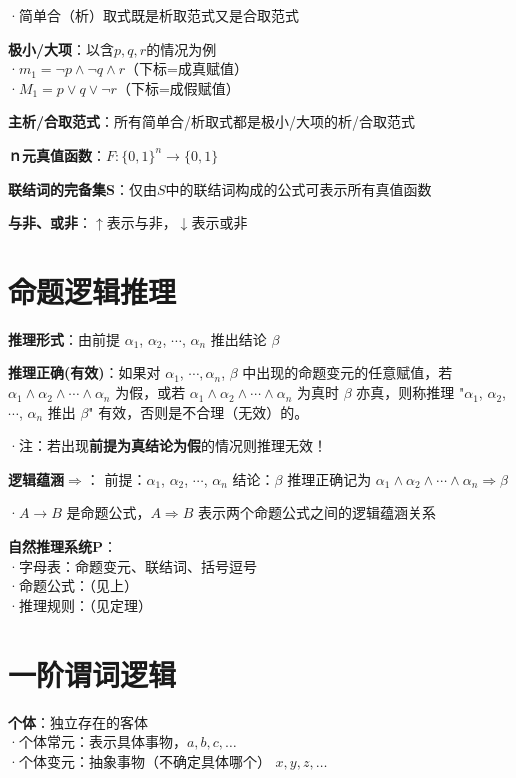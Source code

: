 ·简单合（析）取式既是析取范式又是合取范式

\textbf{极小/大项}：以含$p, q, r$的情况为例\\
·$m_1 = \lnot p \wedge \lnot q \wedge r$（下标=成真赋值）\\
·$M_1 = p \vee q \vee \lnot r$（下标=成假赋值）

\textbf{主析/合取范式}：所有简单合/析取式都是极小/大项的析/合取范式

\textbf{ｎ元真值函数}：$F:\{0,1\}^n \rightarrow \{0,1\}$

\textbf{联结词的完备集S}：仅由$S$中的联结词构成的公式可表示所有真值函数

\textbf{与非、或非}：$\uparrow$表示与非，$\downarrow$表示或非

\section*{命题逻辑推理}
	
\textbf{推理形式}：由前提 $\alpha_1$, $\alpha_2$, $\cdots$, $\alpha_n$ 推出结论 $\beta$

\textbf{推理正确(有效)}：如果对 $\alpha_1$, $\cdots, \alpha_n$, $\beta$ 中出现的命题变元的任意赋值，若 $\alpha_1 \land \alpha_2 \land \cdots \land \alpha_n$ 为假，或若 $\alpha_1 \land \alpha_2 \land \cdots \land \alpha_n$ 为真时 $\beta$ 亦真，则称推理 "$\alpha_1$, $\alpha_2$, $\cdots$, $\alpha_n$ 推出 $\beta$" 有效，否则是不合理（无效）的。

·注：若出现\textbf{前提为真结论为假}的情况则推理无效！

\textbf{逻辑蕴涵}$\Rightarrow$： 前提：$\alpha_1$, $\alpha_2$, $\cdots$, $\alpha_n$ 结论：$\beta$ 推理正确记为 $\alpha_1 \land \alpha_2 \land \cdots \land \alpha_n \Rightarrow \beta$

·$A \rightarrow B$ 是命题公式，$A \Rightarrow B$ 表示两个命题公式之间的逻辑蕴涵关系

\textbf{自然推理系统P}：\\
·字母表：命题变元、联结词、括号逗号\\
·命题公式：（见上）\\
·推理规则：（见定理）

\section*{一阶谓词逻辑}

\textbf{个体}：独立存在的客体\\
·个体常元：表示具体事物，$a, b, c, \ldots$\\
·个体变元：抽象事物（不确定具体哪个） $x, y, z, \ldots$

